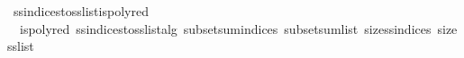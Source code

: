 {    \isanewline
    \isamarkupfalse%
    \ ss{\isacharunderscore}{\kern0pt}indices{\isacharunderscore}{\kern0pt}to{\isacharunderscore}{\kern0pt}ss{\isacharunderscore}{\kern0pt}list{\isacharunderscore}{\kern0pt}is{\isacharunderscore}{\kern0pt}polyred{\isacharcolon}{\kern0pt}\isanewline
    \ \ {\isachardoublequoteopen}ispolyred\ ss{\isacharunderscore}{\kern0pt}indices{\isacharunderscore}{\kern0pt}to{\isacharunderscore}{\kern0pt}ss{\isacharunderscore}{\kern0pt}list{\isacharunderscore}{\kern0pt}alg\ subset{\isacharunderscore}{\kern0pt}sum{\isacharunderscore}{\kern0pt}indices\ subset{\isacharunderscore}{\kern0pt}sum{\isacharunderscore}{\kern0pt}list\ size{\isacharunderscore}{\kern0pt}ss{\isacharunderscore}{\kern0pt}indices\ size{\isacharunderscore}{\kern0pt}ss{\isacharunderscore}{\kern0pt}list{\isachardoublequoteclose}
}

